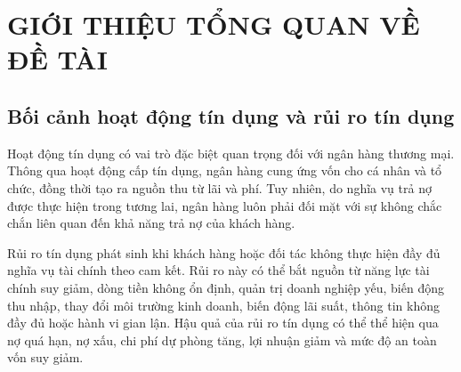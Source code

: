 





\chapter{GIỚI THIỆU TỔNG QUAN VỀ ĐỀ TÀI}

\section{Bối cảnh hoạt động tín dụng và rủi ro tín dụng}

Hoạt động tín dụng có vai trò đặc biệt quan trọng đối với ngân hàng thương mại. Thông qua hoạt động cấp tín dụng, ngân hàng cung ứng vốn cho cá nhân và tổ chức, đồng thời tạo ra nguồn thu từ lãi và phí. Tuy nhiên, do nghĩa vụ trả nợ được thực hiện trong tương lai, ngân hàng luôn phải đối mặt với sự không chắc chắn liên quan đến khả năng trả nợ của khách hàng.

Rủi ro tín dụng phát sinh khi khách hàng hoặc đối tác không thực hiện đầy đủ nghĩa vụ tài chính theo cam kết. Rủi ro này có thể bắt nguồn từ năng lực tài chính suy giảm, dòng tiền không ổn định, quản trị doanh nghiệp yếu, biến động thu nhập, thay đổi môi trường kinh doanh, biến động lãi suất, thông tin không đầy đủ hoặc hành vi gian lận. Hậu quả của rủi ro tín dụng có thể thể hiện qua nợ quá hạn, nợ xấu, chi phí dự phòng tăng, lợi nhuận giảm và mức độ an toàn vốn suy giảm.

